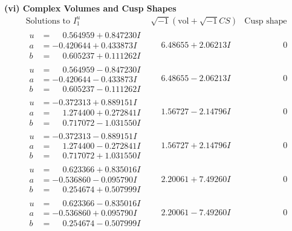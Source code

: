 \documentclass[1p]{elsarticle_modified}
\theoremstyle{definition}
\newcommand{\I}{\sqrt{-1}}
\begin{document}
\newpage\flushleft \textbf{(vi) Complex Volumes and Cusp Shapes}
$$\begin{array}{c|c|c}  
\text{Solutions to }I^u_{1}& \I (\text{vol} + \sqrt{-1}CS) & \text{Cusp shape}\\
 \hline 
\begin{aligned}
u &= \phantom{-}0.564959 + 0.847230 I \\
a &= -0.420644 + 0.433873 I \\
b &= \phantom{-}0.605237 + 0.111262 I\end{aligned}
 & \phantom{-}6.48655 + 2.06213 I & \phantom{-0.000000 } 0 \\ \hline\begin{aligned}
u &= \phantom{-}0.564959 - 0.847230 I \\
a &= -0.420644 - 0.433873 I \\
b &= \phantom{-}0.605237 - 0.111262 I\end{aligned}
 & \phantom{-}6.48655 - 2.06213 I & \phantom{-0.000000 } 0 \\ \hline\begin{aligned}
u &= -0.372313 + 0.889151 I \\
a &= \phantom{-}1.274400 + 0.272841 I \\
b &= \phantom{-}0.717072 - 1.031550 I\end{aligned}
 & \phantom{-}1.56727 - 2.14796 I & \phantom{-0.000000 } 0 \\ \hline\begin{aligned}
u &= -0.372313 - 0.889151 I \\
a &= \phantom{-}1.274400 - 0.272841 I \\
b &= \phantom{-}0.717072 + 1.031550 I\end{aligned}
 & \phantom{-}1.56727 + 2.14796 I & \phantom{-0.000000 } 0 \\ \hline\begin{aligned}
u &= \phantom{-}0.623366 + 0.835016 I \\
a &= -0.536860 - 0.095790 I \\
b &= \phantom{-}0.254674 + 0.507999 I\end{aligned}
 & \phantom{-}2.20061 + 7.49260 I & \phantom{-0.000000 } 0 \\ \hline\begin{aligned}
u &= \phantom{-}0.623366 - 0.835016 I \\
a &= -0.536860 + 0.095790 I \\
b &= \phantom{-}0.254674 - 0.507999 I\end{aligned}
 & \phantom{-}2.20061 - 7.49260 I & \phantom{-0.000000 } 0 \\ \hline\begin{aligned}

\end{aligned}
\end{array}$$
\end{document}
